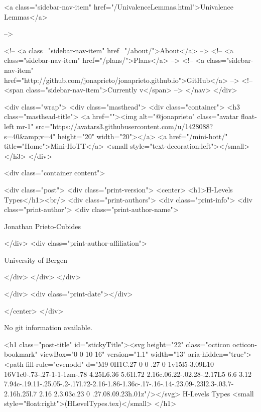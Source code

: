       
    
      
        
          <a class="sidebar-nav-item" href="/UnivalenceLemmas.html">Univalence Lemmas</a>
        
      
     -->

    <!-- <a class="sidebar-nav-item" href="/about/">About</a> -->
    <!-- <a class="sidebar-nav-item" href="/plans/">Plans</a> -->
    <!-- <a class="sidebar-nav-item" href="http://github.com/jonaprieto/jonaprieto.github.io">GitHub</a> -->
    <!-- <span class="sidebar-nav-item">Currently v</span> -->
  </nav>
</div>

    <div class="wrap">
      <div class="masthead">
        <div class="container">
          <h3 class="masthead-title">
            <a href=""><img alt="@jonaprieto" class="avatar float-left mr-1" src="https://avatars3.githubusercontent.com/u/1428088?s=40&amp;v=4" height="20" width="20"></a>
            <a href="/mini-hott/" title="Home">Mini-HoTT</a>
            <small style="text-decoration:left"></small>
          </h3>
        </div>
      
      <div class="container content">
        







<div class="post">
  <div class="print-version">
    <center>
      <h1>H-Levels Types</h1><br/>
        <div class="print-authors">
          <div class="print-info">
            <div class="print-author">
              <div class="print-author-name">
                
                  Jonathan Prieto-Cubides
                
              </div>
              <div class="print-author-affiliation">
                
                  University of Bergen
                
                </div>
            </div>
          </div>
          
          
        </div>
        <div class="print-date"></div>
        
        
    </center>
  </div>

  
  No git information available.
  

  <h1 class="post-title" id="stickyTitle"><svg height="22" class="octicon octicon-bookmark" viewBox="0 0 10 16" version="1.1" width="13" aria-hidden="true"><path fill-rule="evenodd" d="M9 0H1C.27 0 0 .27 0 1v15l5-3.09L10 16V1c0-.73-.27-1-1-1zm-.78 4.25L6.36 5.61l.72 2.16c.06.22-.02.28-.2.17L5 6.6 3.12 7.94c-.19.11-.25.05-.2-.17l.72-2.16-1.86-1.36c-.17-.16-.14-.23.09-.23l2.3-.03.7-2.16h.25l.7 2.16 2.3.03c.23 0 .27.08.09.23h.01z"/></svg> H-Levels Types <small style="float:right">(HLevelTypes.tex)</small>
  </h1>

